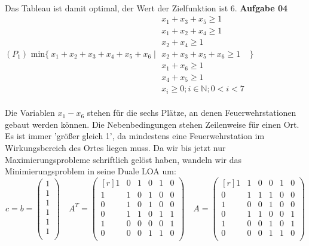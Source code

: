 \documentclass[a4paper,10pt]{article}
\begin{document}
	\\
	Das Tableau ist damit optimal, der Wert der Zielfunktion ist 6.
	\newpage
	\textbf{Aufgabe 04}\\
	$(P_1) \text{ min} \{\ x_1+x_2+x_3+x_4+x_5+x_6 \mid 
	\begin{matrix}
		x_1 + x_3 + x_5 \geq 1\\
		x_1 + x_2 + x_4 \geq 1\\
		x_2 + x_4 \geq 1\\
		x_2 + x_3 + x_5 + x_6 \geq 1\\
		x_1 + x_6 \geq 1\\
		x_4 + x_5 \geq 1 \\
		x_i \geq 0; i\in \mathbb{N}; 0<i<7
	\end{matrix}
	\ \}$
	\\\\
	Die Variablen $ x_1 - x_6 $ stehen für die sechs Plätze, an denen Feuerwehrstationen gebaut werden können. Die Nebenbedingungen stehen Zeilenweise für einen Ort. Es ist immer 'größer gleich 1', da mindestens eine Feuerwehrstation im Wirkungsbereich des Ortes liegen muss. Da wir bis jetzt nur Maximierungsprobleme schriftlich gelöst haben, wandeln wir das Minimierungsproblem in seine Duale LOA um:
	\[
	c = b = 
	\begin{pmatrix}
		1\\
		1\\
		1\\
		1\\
		1\\
		1\\
	\end{pmatrix}
	\quad
	A^T =
	\begin{pmatrix*}[r]
		1 & 0 & 1 & 0 & 1 & 0\\
		1 & 1 & 0 & 1 & 0 & 0\\
		0 & 1 & 0 & 1 & 0 & 0\\
		0 & 1 & 1 & 0 & 1 & 1\\
		1 & 0 & 0 & 0 & 0 & 1\\
		0 & 0 & 0 & 1 & 1 & 0\\
	\end{pmatrix*}
	\quad
	A = 
	\begin{pmatrix*}[r]
		1 & 1 & 0 & 0 & 1 & 0\\
		0 & 1 & 1 & 1 & 0 & 0\\
		1 & 0 & 0 & 1 & 0 & 0\\
		0 & 1 & 1 & 0 & 0 & 1\\
		1 & 0 & 0 & 1 & 0 & 1\\
		0 & 0 & 0 & 1 & 1 & 0\\
	\end{pmatrix*}
	\] \\
\end{document}
